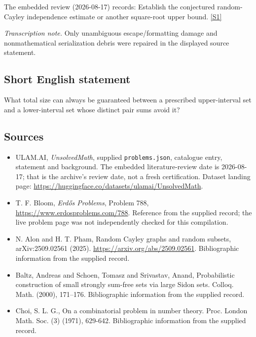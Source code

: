 \documentclass[11pt,a4paper]{article}
\newcommand{\sref}[2]{\hyperlink{source:#1:#2}{[S#2]}}
\begin{document}
The embedded review (2026-08-17) records: Establish the conjectured random-Cayley independence estimate or another square-root upper bound. \sref{statement}{1}

{\small\emph{Transcription note.} Only unambiguous escape/formatting damage and nonmathematical serialization debris were repaired in the displayed source statement.}

\subsection{Short English statement}

What total size can always be guaranteed between a prescribed upper-interval set and a lower-interval set whose distinct pair sums avoid it?

\subsection{Sources}

{\small

\begin{itemize}

\item[\hypertarget{source:statement:1}{S1}] ULAM.AI, \emph{UnsolvedMath}, supplied \texttt{problems.json}, catalogue entry, statement and background. The embedded literature-review date is 2026-08-17; that is the archive’s review date, not a fresh certification. Dataset landing page: \url{https://huggingface.co/datasets/ulamai/UnsolvedMath}.

\item[\hypertarget{source:statement:2}{S2}] T. F. Bloom, \emph{Erdős Problems}, Problem 788, \url{https://www.erdosproblems.com/788}. Reference from the supplied record; the live problem page was not independently checked for this compilation.

\item[\hypertarget{source:statement:3}{S3}] N. Alon and H. T. Pham, Random Cayley graphs and random subsets, arXiv:2509.02561 (2025). \url{https://arxiv.org/abs/2509.02561}. Bibliographic information from the supplied record.

\item[\hypertarget{source:statement:4}{S4}] Baltz, Andreas and Schoen, Tomasz and Srivastav, Anand, Probabilistic construction of small strongly sum-free sets via large {S}idon sets. Colloq. Math. (2000), 171--176. Bibliographic information from the supplied record.

\item[\hypertarget{source:statement:5}{S5}] Choi, S. L. G., On a combinatorial problem in number theory. Proc. London Math. Soc. (3) (1971), 629-642. Bibliographic information from the supplied record.

\end{itemize}

}

\label{end:statement}
\end{document}
